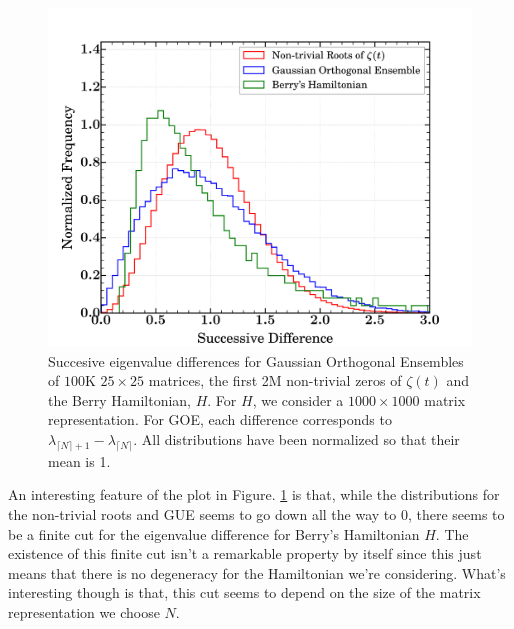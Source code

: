 \documentclass{amsproc}
\theoremstyle{definition}
\theoremstyle{remark}
\numberwithin{equation}{section}
\begin{document}
\begin{figure}
\includegraphics[width=\columnwidth]{figures/everything.pdf}
\caption{Succesive eigenvalue differences for Gaussian Orthogonal Ensembles of $100\mathrm{K}$ $25 \times 25$ matrices, the first 2M non-trivial zeros of $\zeta(t)$ and the Berry Hamiltonian, $H$. For $H$, we consider a $1000 \times 1000$ matrix representation. For GOE, each difference corresponds to $\lambda_{\lceil N \rceil + 1} - \lambda_{ \lceil N \rceil}$. All distributions have been normalized so that their mean is 1. }
\label{fig:everything}
\end{figure}

An interesting feature of the plot in Figure. \ref{fig:everything} is that, while the distributions for the non-trivial roots and GUE seems to go down all the way to 0, there seems to be a finite cut for the eigenvalue difference for Berry's Hamiltonian $H$. The existence of this finite cut isn't a remarkable property by itself since this just means that there is no degeneracy for the Hamiltonian we're considering. What's interesting though is that, this cut seems to depend on the size of the matrix representation we choose $N$.
\end{document}
